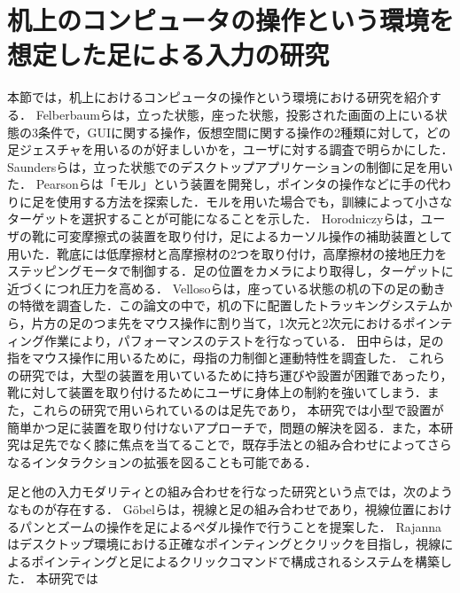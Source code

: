 \section{机上のコンピュータの操作という環境を想定した足による入力の研究}

本節では，机上におけるコンピュータの操作という環境における研究を紹介する．
Felberbaumら\cite{Felberbaum:2018:BUF:3173574.3173908}は，立った状態，座った状態，投影された画面の上にいる状態の3条件で，GUIに関する操作，仮想空間に関する操作の2種類に対して，どの足ジェスチャを用いるのが好ましいかを，ユーザに対する調査で明らかにした．
Saundersら\cite{Saunders:2016:TFI:2901790.2901815}は，立った状態でのデスクトップアプリケーションの制御に足を用いた．
Pearsonら\cite{Pearson:1986:MMD:22627.22392, Pearson:1988:EET:49108.1046356}は「モル」という装置を開発し，ポインタの操作などに手の代わりに足を使用する方法を探索した．モルを用いた場合でも，訓練によって小さなターゲットを選択することが可能になることを示した．
Horodniczyら\cite{Horodniczy:2017:FHE:3025453.3025625}は，ユーザの靴に可変摩擦式の装置を取り付け，足によるカーソル操作の補助装置として用いた．靴底には低摩擦材と高摩擦材の2つを取り付け，高摩擦材の接地圧力をステッピングモータで制御する．足の位置をカメラにより取得し，ターゲットに近づくにつれ圧力を高める．
Vellosoら\cite{velloso:hal-01599657}は，座っている状態の机の下の足の動きの特徴を調査した．この論文の中で，机の下に配置したトラッキングシステムから，片方の足のつま先をマウス操作に割り当て，1次元と2次元におけるポインティング作業により，パフォーマンスのテストを行なっている．
田中ら\cite{110004704997}は，足の指をマウス操作に用いるために，母指の力制御と運動特性を調査した．
これらの研究では，大型の装置を用いているために持ち運びや設置が困難であったり，靴に対して装置を取り付けるためにユーザに身体上の制約を強いてしまう．また，これらの研究で用いられているのは足先であり，
本研究では小型で設置が簡単かつ足に装置を取り付けないアプローチで，問題の解決を図る．また，本研究は足先でなく膝に焦点を当てることで，既存手法との組み合わせによってさらなるインタラクションの拡張を図ることも可能である．

足と他の入力モダリティとの組み合わせを行なった研究という点では，次のようなものが存在する．
G\"{o}belら\cite{Gobel:2013:GFI:2468356.2479610}は，視線と足の組み合わせであり，視線位置におけるパンとズームの操作を足によるペダル操作で行うことを提案した．
Rajanna\cite{Rajanna:2016:GFI:2876456.2876462}はデスクトップ環境における正確なポインティングとクリックを目指し，視線によるポインティングと足によるクリックコマンドで構成されるシステムを構築した．
本研究では


